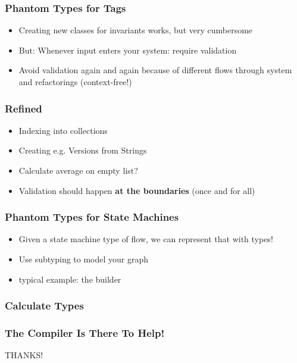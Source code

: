 \documentclass{beamer}
\begin{document}
\begin{frame}
  \frametitle{Phantom Types for Tags}
  \begin{itemize}
  \item Creating new classes for invariants works, but very cumbersome
  \item But: Whenever input enters your system: require validation
  \item Avoid validation again and again because of different flows
    through system and refactorings (context-free!)
  \end{itemize}
\end{frame}

\begin{frame}
  \frametitle{Refined}
  \begin{itemize}
  \item Indexing into collections
  \item Creating e.g. Versions from Strings
  \item Calculate average on empty list?
  \item Validation should happen \textbf{at the boundaries} (once and
    for all)
  \end{itemize}
\end{frame}

\begin{frame}
  \frametitle{Phantom Types for State Machines}
  \begin{itemize}
  \item Given a state machine type of flow, we can represent that with
    types!
  \item Use subtyping to model your graph
  \item typical example: the builder
  \end{itemize}
\end{frame}

\begin{frame}
  \frametitle{Calculate Types}
\end{frame}

\begin{frame}
  \frametitle{The Compiler Is There To Help!}
  \vfill
  \begin{center}
    {\Huge THANKS!}
  \end{center}
\end{frame}
\end{document}
